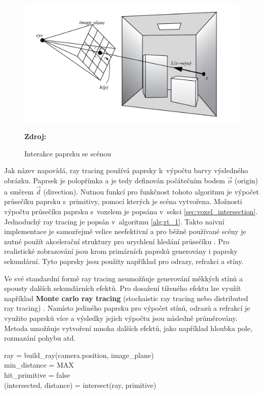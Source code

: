 \begin{figure}[H]
	\centering
	\includegraphics[scale=1]{obrazky-figures/ray_tracing_plane.png}
	\caption{Interakce paprsku se scénou}
	\textbf{Zdroj: \cite{advanced_global}}
	\label{fig:3d_grid}
\end{figure}


Jak název napovídá, ray tracing používá paprsky k~výpočtu barvy výsledného obrázku. Paprsek je polopřímka a je tedy definován počátečním bodem $\Vec{o}$ (origin) a směrem $\Vec{d}$ (direction). Nutnou funkcí pro funkčnost tohoto algoritmu je výpočet průsečíku paprsku s~primitivy, pomocí kterých je scéna vytvořena. Možnosti výpočtu průsečíku paprsku s~voxelem je popsána v~sekci \ref{sec:voxel_intersection}. Jednoduchý ray tracing je popsán v~algoritmu \ref{alg:rt_1}. Takto naivní implementace je samozřejmě velice neefektivní a pro běžně používané scény je nutné použít akcelerační struktury pro urychlení hledání průsečíku \cite{accelerated_rt}. Pro realistické zobrazování jsou krom primárních paprsků generovány i paprsky sekundární. Tyto paprsky jsou použity například pro odrazy, refrakci a stíny.

Ve své standardní formě ray tracing neumožňuje generování měkkých stínů a spousty dalších sekundárních efektů.  Pro dosažení tíženého efektu lze využít například \textbf{Monte carlo ray tracing} (stochaistic ray tracing nebo distributed ray tracing) \cite{distributed_rt}. Namísto jediného paprsku pro výpočet stínů, odrazů a refrakcí je využito paprsků více a výsledky jejich výpočtu jsou následně průměrovány. Metoda umožňuje vytvoření mnoha dalších efektů, jako například hloubka pole, rozmazání pohybu atd.

\begin{center}
	\begin{czechalgorithm}[H] \label{alg:rt_1}
		ray = build\_ray(camera.position, image\_plane)\\
		min\_distance = MAX\\
		hit\_primitive = false\\
		 {
			(intersected, distance) = intersect(ray, primitive)\\
		}
		\caption{Ray tracing}
	\end{czechalgorithm}
\end{center}

